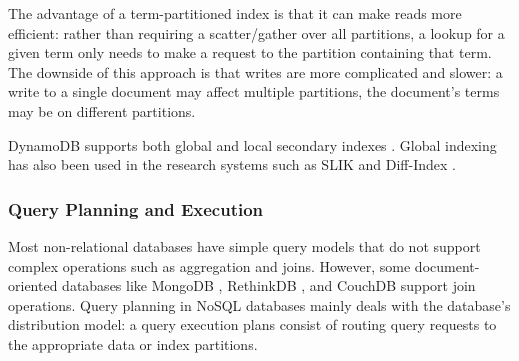 The advantage of a term-partitioned index is that it can make reads more efficient:
rather than requiring a scatter/gather over all partitions, a lookup for a given term only needs to make a request to the
partition containing that term.
The downside of this approach is that writes are more complicated and slower:
a write to a single document may affect multiple partitions, the document's terms may be on different partitions.

DynamoDB supports both global and local secondary indexes \cite{dynamodb:secondaryindexes}.
Global indexing has also been used in the research systems such as SLIK \cite{kejriwal:slik} and Diff-Index \cite{tan:diffindex}.

\subsubsection{Query Planning and Execution}

Most non-relational databases have simple query models that do not support complex operations such as aggregation and
joins.
However, some document-oriented databases like MongoDB \cite{mongodb:joins}, RethinkDB \cite{rethinkdb:joins}, and CouchDB \cite{couchdb:joins} support join operations.
Query planning in NoSQL databases mainly deals with the database's distribution model:
a query execution plans consist of routing query requests to the appropriate data or index partitions.








